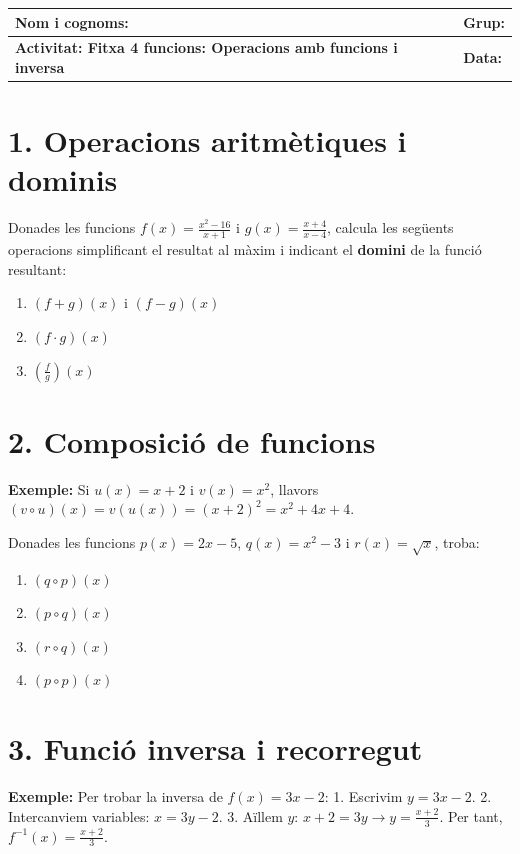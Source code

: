 \documentclass[12pt,a4paper]{article}
\begin{document}
\begingroup
\renewcommand{\arraystretch}{2.2}
\begin{tabularx}{\textwidth}{|X|p{4cm}|}
    \hline
    \textbf{Nom i cognoms:} & \textbf{Grup:} \\ \hline
    \textbf{Activitat: Fitxa 4 funcions: Operacions amb funcions i inversa } & \textbf{Data:} \\ \hline
\end{tabularx}
\endgroup

\section*{1. Operacions aritmètiques i dominis}
Donades les funcions $f(x) = \frac{x^2-16}{x+1}$ i $g(x) = \frac{x+4}{x-4}$, calcula les següents operacions simplificant el resultat al màxim i indicant el \textbf{domini} de la funció resultant:

\begin{enumerate}[label=\alph*)]
    \item $(f+g)(x)$ i $(f-g)(x)$
    \item $(f \cdot g)(x)$ 
    \item $\left(\frac{f}{g}\right)(x)$
\end{enumerate}

\section*{2. Composició de funcions}
\textbf{Exemple:} Si $u(x) = x+2$ i $v(x) = x^2$, llavors $(v \circ u)(x) = v(u(x)) = (x+2)^2 = x^2 + 4x + 4$.

\vspace{0.3cm}
Donades les funcions $p(x) = 2x - 5$, $q(x) = x^2 - 3$ i $r(x) = \sqrt{x}$, troba:
\begin{enumerate}[label=\alph*)]
    \item $(q \circ p)(x)$ 
    \item $(p \circ q)(x)$ 
    \item $(r \circ q)(x)$ 
    \item $(p \circ p)(x)$
\end{enumerate}

\section*{3. Funció inversa i recorregut}
\textbf{Exemple:} Per trobar la inversa de $f(x) = 3x - 2$:
1. Escrivim $y = 3x - 2$.
2. Intercanviem variables: $x = 3y - 2$.
3. Aïllem $y$: $x+2 = 3y \rightarrow y = \frac{x+2}{3}$. Per tant, $f^{-1}(x) = \frac{x+2}{3}$.
\end{document}
